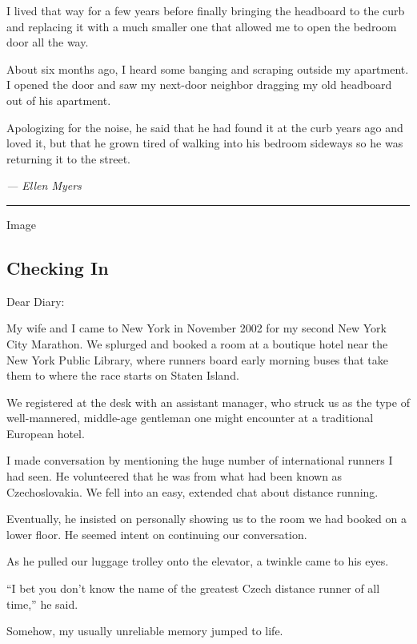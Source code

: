 I lived that way for a few years before finally bringing the headboard
to the curb and replacing it with a much smaller one that allowed me to
open the bedroom door all the way.

About six months ago, I heard some banging and scraping outside my
apartment. I opened the door and saw my next-door neighbor dragging my
old headboard out of his apartment.

Apologizing for the noise, he said that he had found it at the curb
years ago and loved it, but that he grown tired of walking into his
bedroom sideways so he was returning it to the street.

\emph{--- Ellen Myers}

\begin{center}\rule{0.5\linewidth}{\linethickness}\end{center}

Image

\hypertarget{checking-in}{%
\subsection{Checking In}\label{checking-in}}

Dear Diary:

My wife and I came to New York in November 2002 for my second New York
City Marathon. We splurged and booked a room at a boutique hotel near
the New York Public Library, where runners board early morning buses
that take them to where the race starts on Staten Island.

We registered at the desk with an assistant manager, who struck us as
the type of well-mannered, middle-age gentleman one might encounter at a
traditional European hotel.

I made conversation by mentioning the huge number of international
runners I had seen. He volunteered that he was from what had been known
as Czechoslovakia. We fell into an easy, extended chat about distance
running.

Eventually, he insisted on personally showing us to the room we had
booked on a lower floor. He seemed intent on continuing our
conversation.

As he pulled our luggage trolley onto the elevator, a twinkle came to
his eyes.

``I bet you don't know the name of the greatest Czech distance runner of
all time,'' he said.

Somehow, my usually unreliable memory jumped to life.

